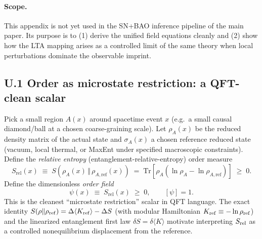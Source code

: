 \documentclass[10pt]{article}
\begin{document}
\paragraph{Scope.}
This appendix is not yet used in the SN+BAO inference pipeline of the main paper. Its purpose is to
(1) derive the unified field equations cleanly and (2) show how the LTA mapping arises as a controlled
limit of the same theory when local perturbations dominate the observable imprint.

\subsection{U.1 Order as microstate restriction: a QFT-clean scalar}
\label{app:unified:order_def}

Pick a small region $A(x)$ around spacetime event $x$ (e.g.\ a small causal diamond/ball at a chosen
coarse-graining scale). Let $\rho_A(x)$ be the reduced density matrix of the actual state and
$\sigma_A(x)$ a chosen reference reduced state (vacuum, local thermal, or MaxEnt under specified macroscopic constraints).
Define the \emph{relative entropy} (entanglement-relative-entropy) order measure
\begin{equation}
S_{\mathrm{rel}}(x)\;\equiv\;S\!\left(\rho_A(x)\,\Vert\,\rho_{A,\mathrm{ref}}(x)\right)
\;=\;\mathrm{Tr}\left[\rho_A\left(\ln\rho_A-\ln\rho_{A,\mathrm{ref}}\right)\right]\;\ge\;0.
\label{eq:U_Srel_def}
\end{equation}
Define the dimensionless \emph{order field}
\begin{equation}
\psi(x)\;\equiv\;S_{\mathrm{rel}}(x)\;\ge\;0,
\qquad [\psi]=1.
\label{eq:U_psi_def}
\end{equation}
This is the cleanest ``microstate restriction'' scalar in QFT language. The exact identity
$S(\rho\Vert\rho_{\rm ref})=\Delta\langle K_{\rm ref}\rangle-\Delta S$ (with modular Hamiltonian
$K_{\rm ref}\equiv-\ln\rho_{\rm ref}$) and the linearized entanglement first law $\delta S=\delta\langle K\rangle$
motivate interpreting $S_{\rm rel}$ as a controlled nonequilibrium displacement from the reference.
\end{document}
